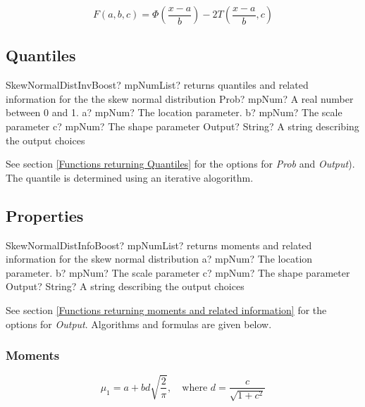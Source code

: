 \begin{equation} 
	F(a,b,c)=  \Phi \left(\frac{x-a}{b}\right) -  2T \left(\frac{x-a}{b}, c \right)
\end{equation}


\subsection{Quantiles}
\label{SkewNormalDistributionQuantiles}



\begin{mpFunctionsExtract}
	\mpFunctionFive
	{SkewNormalDistInvBoost? mpNumList? returns quantiles and related information for the the skew normal distribution}
	{Prob? mpNum? A real number between 0 and 1.}
	{a? mpNum? The location parameter.}
	{b? mpNum? The scale parameter}
	{c? mpNum? The shape parameter}
	{Output? String? A string describing the output choices}
\end{mpFunctionsExtract}

\vspace{0.3cm}
See section \ref{Functions returning Quantiles} for the options for  {\itshape\sffamily Prob} and {\itshape\sffamily Output}). 
The quantile is determined using an iterative alogorithm.


\subsection{Properties}
\label{SkewNormalDistributionProperties}


\begin{mpFunctionsExtract}
	\mpFunctionFour
	{SkewNormalDistInfoBoost? mpNumList? returns moments and related information for the skew normal distribution}
	{a? mpNum? The location parameter.}
	{b? mpNum? The scale parameter}
	{c? mpNum? The shape parameter}
	{Output? String? A string describing the output choices}
\end{mpFunctionsExtract}

\vspace{0.3cm}

See section \ref{Functions returning moments and related information} for the options for {\itshape\sffamily Output}. Algorithms and formulas are given below.

\subsubsection{Moments}

\begin{equation} 
	\mu_1 = a+bd\sqrt{\frac{2}{\pi}}, \quad \text{where } d=\frac{c}{\sqrt{1+c^2}}
\end{equation}

